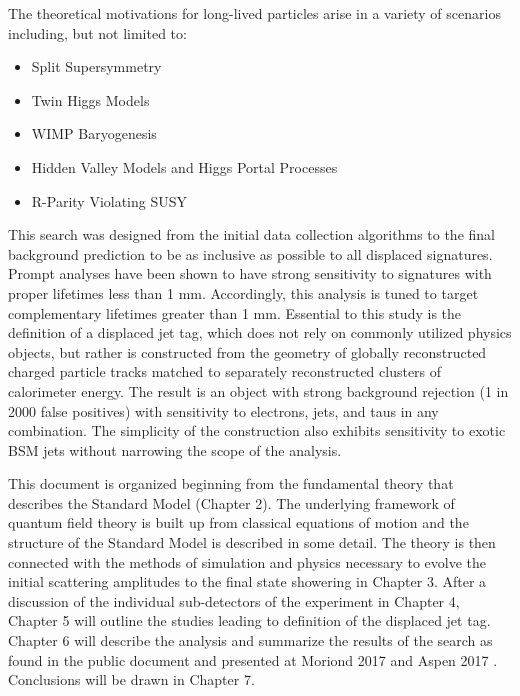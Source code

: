 The theoretical motivations for long-lived particles arise in a variety of scenarios including, but not limited to:
\begin{itemize}
\item Split Supersymmetry \cite{nimalhc,splitsusy,nimasplit,nimahiggs,hewett}
\item Twin Higgs Models  \cite{twinhiggs}
\item WIMP Baryogenesis \cite{wimpbaryo}
\item Hidden Valley Models and Higgs Portal Processes \cite{hiddenvalley}
\item R-Parity Violating SUSY \cite{displacedsusy} 
\end{itemize}

This search was designed from the initial data collection algorithms to the final background prediction
to be as inclusive as possible to all displaced signatures. 
Prompt analyses have been shown to have strong
sensitivity to signatures with proper lifetimes less than 1 mm. Accordingly, this analysis is tuned
to target complementary lifetimes greater than 1 mm. Essential to this study is the definition of a 
displaced jet tag, which does not rely on commonly utilized physics objects, but
rather is constructed from the geometry of globally reconstructed charged particle tracks 
matched to separately reconstructed clusters of calorimeter energy. The result is an object with
strong background rejection (1 in 2000 false positives) with sensitivity to electrons, jets, and taus
in any combination. The simplicity of the construction also exhibits sensitivity to exotic BSM
jets without narrowing the scope of the analysis. 

This document is organized beginning from the fundamental theory that describes the Standard Model
(Chapter 2). The underlying framework of quantum field theory is built up from classical equations of motion and the structure of the Standard Model is described in some detail. The theory is then connected with  
the methods of simulation and  physics necessary to evolve the initial scattering 
amplitudes to the final state showering in Chapter 3. After a discussion of the individual 
sub-detectors of the experiment in Chapter 4, Chapter 5 will outline the studies leading to definition
of the displaced jet tag. Chapter 6 will describe the analysis and summarize the results
of the search as found in the public document \cite{EXO-16-003} and presented at Moriond 2017 \cite{Mor} and Aspen 2017 \cite{Asp}. 
Conclusions will be drawn in Chapter 7.
